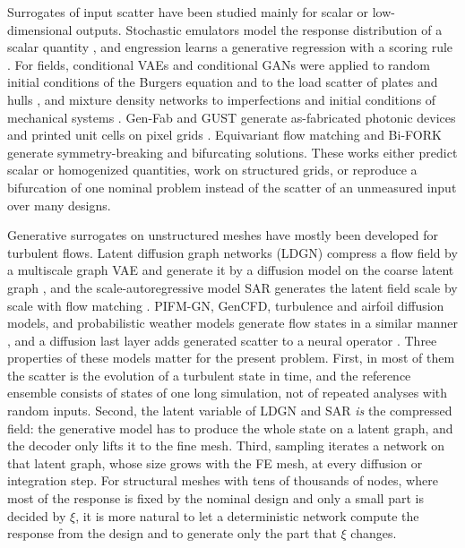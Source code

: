 \documentclass[preprint,12pt]{elsarticle}
\begin{document}
Surrogates of input scatter have been studied mainly for scalar or low-dimensional outputs.
Stochastic emulators model the response distribution of a scalar quantity
\cite{zhu2021glam,zhu2023spce,luthen2023spectral}, and engression learns a generative regression
with a scoring rule \cite{shen2025engression}. For fields, conditional VAEs and conditional GANs
were applied to random initial conditions of the Burgers equation \cite{yang2019conditional} and
to the load scatter of plates and hulls \cite{silionis2024deep}, and mixture density networks to
imperfections and initial conditions of mechanical systems \cite{han2026multimodal}. Gen-Fab and
GUST generate as-fabricated photonic devices and printed unit cells on pixel grids
\cite{azimi2026genfab,zheng2026gust}. Equivariant flow matching \cite{hendriks2025equivariant}
and Bi-FORK \cite{zimmel2026bifork} generate symmetry-breaking and bifurcating solutions. These
works either predict scalar or homogenized quantities, work on structured grids, or reproduce a
bifurcation of one nominal problem instead of the scatter of an unmeasured input over many
designs.

Generative surrogates on unstructured meshes have mostly been developed for turbulent flows.
Latent diffusion graph networks (LDGN) compress a flow field by a multiscale graph VAE and
generate it by a diffusion model on the coarse latent graph \cite{lino2025distributions}, and the
scale-autoregressive model SAR generates the latent field scale by scale with flow matching
\cite{lino2026sar}. PIFM-GN, GenCFD, turbulence and airfoil diffusion models, and probabilistic
weather models generate flow states in a similar manner
\cite{song2026pifm,molinaro2024gencfd,lienen2024turbdiff,liu2024uncertainty,oskarsson2024graphefm,price2025gencast,alet2025fgn},
and a diffusion last layer adds generated scatter to a neural operator \cite{park2026dll}. Three
properties of these models matter for the present problem. First, in most of them the scatter is
the evolution of a turbulent state in time, and the reference ensemble consists of states of
one long simulation, not of repeated analyses with random inputs. Second, the latent variable of
LDGN and SAR \emph{is} the compressed field: the generative model has to produce the whole state
on a latent graph, and the decoder only lifts it to the fine mesh. Third, sampling iterates a
network on that latent graph, whose size grows with the FE mesh, at every diffusion or
integration step. For structural meshes with tens of thousands of nodes, where most of the
response is fixed by the nominal design and only a small part is decided by $\xi$, it is more
natural to let a deterministic network compute the response from the design and to generate only
the part that $\xi$ changes.
\end{document}
